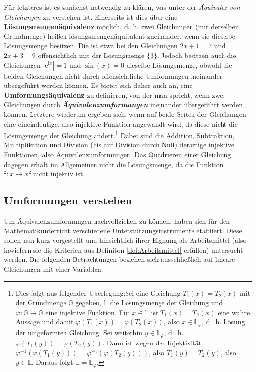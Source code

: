 \documentclass[
]{scrbook}
\theoremstyle{definition}
\theoremstyle{definition}
\theoremstyle{definition}
\theoremstyle{definition}
\theoremstyle{remark}
\begin{document}
Für letzteres ist es zunächst notwendig zu klären, was unter der \emph{Äquivalez von Gleichungen} zu verstehen ist. Einerseits ist dies über eine \textbf{Lösungsmengenäquivalenz} möglich, d.~h. zwei Gleichungen (mit derselben Grundmenge) heißen lösungsmengenäquivalent zueinander, wenn sie dieselbe Lösungsmenge besitzen. Die ist etwa bei den Gleichungen \(2x+ 1 = 7\) und \(2x + 3 = 9\) offensichtlich mit der Lösungmenge \(\{3\}\). Jedoch besitzen auch die Gleichungen \(|\mathrm{e}^{\mathrm{i}x}| = 1\) und \(\sin(x) = 0\) dieselbe Lösungsmenge, obwohl die beiden Gleichungen nicht durch offensichtliche Umformungen ineinander übergeführt werden können. Es bietet sich daher auch an, eine \textbf{Umformungsäquivalenz} zu definieren, von der man spricht, wenn zwei Gleichungen durch \textbf{\emph{Äquivalenzumformungen}} ineinander übergeführt werden können. Letztere wiederum ergeben sich, wenn auf beide Seiten der Gleichungen eine eineindeutige, also injektive Funktion angewandt wird, da diese nicht die Lösungsmenge der Gleichung ändert.\footnote{Dies folgt aus folgender Überlegung:Sei eine Gleichung \(T_1(x) = T_2(x)\) mit der Grundmenge \(\mathbb{G}\) gegeben, \(\mathbb{L}\) die Lösungsmenge der Gleichung und \(\varphi: \mathbb{G}\rightarrow \mathbb{G}\) eine injektive Funktion. Für \(x \in \mathbb{L}\) ist \(T_1(x) = T_2(x)\) eine wahre Aussage und damit \(\varphi(T_1(x)) = \varphi(T_2(x))\), also \(x\in\mathbb{L}_\varphi\), d.~h. Lösung der umgeformten Gleichung. Sei weiterhin \(y\in \mathbb{L}_\varphi\), d.~h. \(\varphi(T_1(y)) = \varphi(T_2(y))\). Dann ist wegen der Injektivität \(\varphi^{-1}(\varphi(T_1(y))) = \varphi^{-1}(\varphi(T_2(y)))\), also \(T_1(y) = T_2(y)\), also \(y\in\mathbb{L}\). Daraus folgt \(\mathbb{L} = \mathbb{L}_\varphi\).} Dabei sind die Addition, Subtraktion, Multiplikation und Division (bis auf Division durch Null) derartige injektive Funktionen, also Äquivalenzumformungen. Das Quadrieren einer Gleichung dagegen erhält im Allgemeinen nicht die Lösungsmenge, da die Funktion \(^2: x \mapsto x^2\) nicht injektiv ist.

\subsection{Umformungen verstehen}\label{umformungen-verstehen}

Um Äquivalenzumformungen nachvollziehen zu können, haben sich für den Mathematikunterricht verschiedene Unterstützungsinstrumente etabliert. Diese sollen nun kurz vorgestellt und hinsichtlich ihrer Eignung als Arbeitsmittel (also inwiefern sie die Kriterien aus Definiton \ref{def:Arbeitsmittel} erfüllen) untersucht werden. Die folgenden Betrachtungen beziehen sich ausschließlich auf lineare Gleichungen mit einer Variablen.
\end{document}

